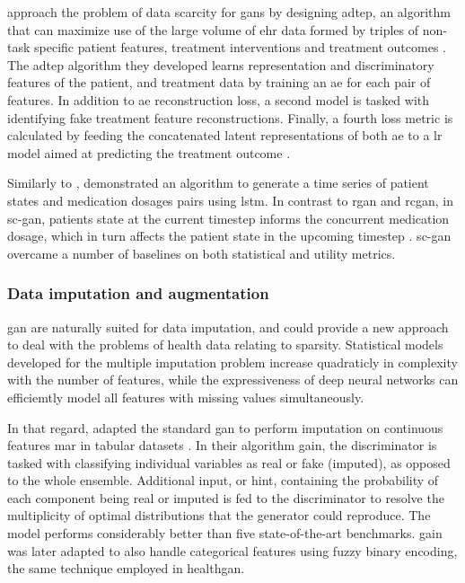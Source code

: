         \citeauthor{chu2019treatment} approach the problem of data scarcity for \gls{gan}s by designing \gls{adtep}, an algorithm that can maximize use of the large volume of \gls{ehr} data formed by triples of non-task specific patient features, treatment interventions and treatment outcomes \cite{chu2019treatment}. The \gls{adtep} algorithm they developed learns representation and discriminatory features of the patient, and treatment data by training an \gls{ae} for each pair of features. In addition to \gls{ae} reconstruction loss, a second model is tasked with identifying fake treatment feature reconstructions. Finally, a fourth loss metric is calculated by feeding the concatenated latent representations of both \gls{ae} to a \gls{lr} model aimed at predicting the treatment outcome \cite{chu2019treatment}.\par
    
        Similarly to \citeauthor{esteban2017real}, \citeauthor{Wang_2019} demonstrated an algorithm to generate a time series of patient states and medication dosages pairs using \gls{lstm}. In contrast to \gls{rgan} and \gls{rcgan}, in \gls{sc-gan}, patients state at the current timestep informs the concurrent medication dosage, which in turn affects the patient state in the upcoming timestep \cite{Wang_2019}. \gls{sc-gan} overcame a number of baselines on both statistical and utility metrics.
    
    \subsubsection{Data imputation and augmentation}
    
        \gls{gan} are naturally suited for data imputation, and could provide a new approach to deal with the problems of health data relating to sparsity. Statistical models developed for the multiple imputation problem increase quadraticly in complexity with the number of features, while the expressiveness of deep neural networks can efficiemtly model all features with missing values simultaneously.\par
    
        In that regard, \citeauthor{yoon2018imputation} adapted the standard \gls{gan} to perform imputation on continuous features \gls{mar} in tabular datasets \cite{yoon2018imputation}. In their algorithm \gls{gain}, the discriminator is tasked with classifying individual variables as real or fake (imputed), as opposed to the whole ensemble. Additional input, or hint, containing the probability of each component being real or imputed is fed to the discriminator to resolve the multiplicity of optimal distributions that the generator could reproduce. The model performs considerably better than five state-of-the-art benchmarks. \gls{gain} was later adapted to also handle categorical features using fuzzy binary encoding, the same technique employed in \gls{healthgan}.\par
    
